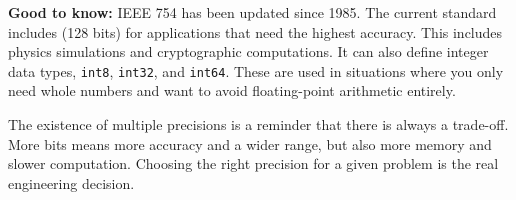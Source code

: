 \textbf{Good to know:} IEEE 754 has been updated since 1985. The current standard includes
 (128 bits) for applications
that need the highest accuracy. This includes physics simulations and cryptographic
computations. It can also define integer data types, \texttt{int8}, \texttt{int32}, and
\texttt{int64}. These are used in situations where you only need whole numbers and want to avoid floating-point arithmetic entirely. 

The existence of multiple precisions is a reminder that there is always a trade-off.
More bits means more accuracy and a wider range, but also more memory and slower
computation. Choosing the right precision for a given problem is the real engineering
decision.






